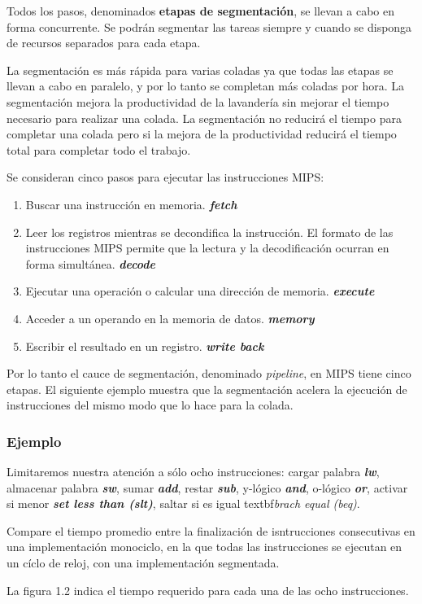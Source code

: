 \documentclass[12pt,a4paper]{report}
\begin{document}
		\par Todos los pasos, denominados \textbf{etapas de segmentación}, se llevan a cabo en forma concurrente. Se podrán segmentar las tareas siempre y cuando se disponga de recursos separados para cada etapa.
		\par La segmentación es más rápida para varias coladas ya que todas las etapas se llevan a cabo en paralelo, y por lo tanto se completan más coladas por hora. La segmentación mejora la productividad de la lavandería sin mejorar el tiempo necesario para realizar una colada. La segmentación no reducirá el tiempo para completar una colada pero si la mejora de la productividad reducirá el tiempo total para completar todo el trabajo.
		\par Se consideran cinco pasos para ejecutar las instrucciones MIPS:
		\begin{enumerate}
			\item Buscar una instrucción en memoria. \textbf{\textit{fetch}}
			\item Leer los registros mientras se decondifica la instrucción. El formato de las instrucciones MIPS permite que la lectura y la decodificación ocurran en forma simultánea. \textbf{\textit{decode}}
			\item Ejecutar una operación o calcular una dirección de memoria. \textbf{\textit{execute}}
			\item Acceder a un operando en la memoria de datos. \textbf{\textit{memory}}
			\item Escribir el resultado en un registro. \textbf{\textit{write back}}
		\end{enumerate}

		\par Por lo tanto el cauce de segmentación, denominado \textit{pipeline}, en MIPS tiene cinco etapas. El siguiente ejemplo muestra que la segmentación acelera la ejecución de instrucciones del mismo modo que lo hace para la colada.

			\subsubsection{Ejemplo}
				\par Limitaremos nuestra atención a sólo ocho instrucciones: cargar palabra \textbf{\textit{lw}}, almacenar palabra \textbf{\textit{sw}}, sumar \textbf{\textit{add}}, restar \textbf{\textit{sub}}, y-lógico \textbf{\textit{and}}, o-lógico \textbf{\textit{or}}, activar si menor \textbf{\textit{set less than (slt)}}, saltar si es igual textbf{\textit{brach equal (beq)}}.
				\par Compare el tiempo promedio entre la finalización de isntrucciones consecutivas en una implementación monociclo, en la que todas las instrucciones se ejecutan en un cíclo de reloj, con una implementación segmentada.
				\par La figura 1.2 indica el tiempo requerido para cada una de las ocho instrucciones.
\end{document}
